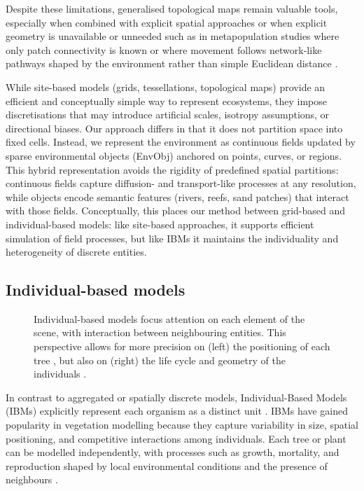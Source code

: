 Despite these limitations, generalised topological maps remain valuable tools, especially when combined with explicit spatial approaches \cite{Ecormier-Nocca2021} or when explicit geometry is unavailable or unneeded such as in metapopulation studies where only patch connectivity is known \cite{Duflot2018} or where movement follows network-like pathways shaped by the environment rather than simple Euclidean distance \cite{Boussange2022,Mari2014,Carrara2012}.

\midConclusion

While site-based models (grids, tessellations, topological maps) provide an efficient and conceptually simple way to represent ecosystems, they impose discretisations that may introduce artificial scales, isotropy assumptions, or directional biases. Our approach differs in that it does not partition space into fixed cells. Instead, we represent the environment as continuous fields updated by sparse environmental objects (EnvObj) anchored on points, curves, or regions. This hybrid representation avoids the rigidity of predefined spatial partitions: continuous fields capture diffusion- and transport-like processes at any resolution, while objects encode semantic features (rivers, reefs, sand patches) that interact with those fields. Conceptually, this places our method between grid-based and individual-based models: like site-based approaches, it supports efficient simulation of field processes, but like IBMs it maintains the individuality and heterogeneity of discrete entities.

\subsection{Individual-based models}

\begin{figure}
    \caption{Individual-based models focus attention on each element of the scene, with interaction between neighbouring entities. This perspective allows for more precision on (left) the positioning of each tree \cite{Alsweis2006}, but also on (right) the life cycle and geometry of the individuals \cite{Peytavie2024a}.}
    \label{fig:env-obj-individual-based-models}
\end{figure}

In contrast to aggregated or spatially discrete models, Individual-Based Models (IBMs) explicitly represent each organism as a distinct unit \cite{Crooks2017}. IBMs have gained popularity in vegetation modelling because they capture variability in size, spatial positioning, and competitive interactions among individuals. Each tree or plant can be modelled independently, with processes such as growth, mortality, and reproduction shaped by local environmental conditions and the presence of neighbours \cite{Chng2013,Peytavie2024a}.

